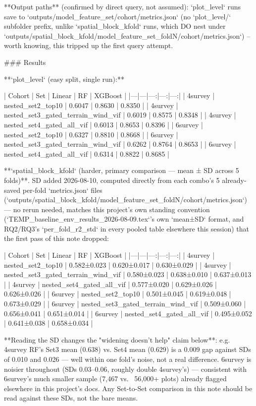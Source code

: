 **Output paths** (confirmed by direct query, not assumed): `plot_level` runs save to
`outputs/{model}_{feature_set}/{cohort}/metrics.json` (no `plot_level/` subfolder prefix, unlike
`spatial_block_kfold` runs, which DO nest under `outputs/spatial_block_kfold/{model}_{feature_set}_fold{N}/{cohort}/metrics.json`)
-- worth knowing, this tripped up the first query attempt.

### Results

**`plot_level` (easy split, single run):**

| Cohort | Set | Linear | RF | XGBoost |
|---|---|---:|---:|---:|
| 4survey | nested_set2_top10 | 0.6047 | 0.8630 | 0.8350 |
| 4survey | nested_set3_gated_terrain_wind_vif | 0.6019 | 0.8575 | 0.8348 |
| 4survey | nested_set4_gated_all_vif | 0.6013 | 0.8653 | 0.8396 |
| 6survey | nested_set2_top10 | 0.6327 | 0.8810 | 0.8668 |
| 6survey | nested_set3_gated_terrain_wind_vif | 0.6262 | 0.8764 | 0.8653 |
| 6survey | nested_set4_gated_all_vif | 0.6314 | 0.8822 | 0.8685 |

**`spatial_block_kfold` (harder, primary comparison — mean ± SD across 5 folds)**. SD added
2026-08-10, computed directly from each combo's 5 already-saved per-fold `metrics.json` files
(`outputs/spatial_block_kfold/{model}_{feature_set}_fold{N}/{cohort}/metrics.json`) — no rerun
needed, matches this project's own standing convention (`TEMP_baseline_env_results_2026-08-09.tex`'s
own `mean±SD` format, and RQ2/RQ3's `per_fold_r2_std` in every pooled table elsewhere this
session) that the first pass of this note dropped:

| Cohort | Set | Linear | RF | XGBoost |
|---|---|---:|---:|---:|
| 4survey | nested_set2_top10 | 0.582±0.023 | 0.620±0.017 | 0.630±0.029 |
| 4survey | nested_set3_gated_terrain_wind_vif | 0.580±0.023 | 0.638±0.010 | 0.637±0.013 |
| 4survey | nested_set4_gated_all_vif | 0.577±0.020 | 0.629±0.026 | 0.626±0.026 |
| 6survey | nested_set2_top10 | 0.501±0.045 | 0.619±0.048 | 0.673±0.029 |
| 6survey | nested_set3_gated_terrain_wind_vif | 0.509±0.060 | 0.656±0.041 | 0.651±0.014 |
| 6survey | nested_set4_gated_all_vif | 0.495±0.052 | 0.641±0.038 | 0.658±0.034 |

**Reading the SD changes the "widening doesn't help" claim below**: e.g. 4survey RF's Set3 mean
(0.638) vs. Set4 mean (0.629) is a 0.009 gap against SDs of 0.010 and 0.026 — well within one
fold's noise, not a real difference. 6survey is noisier throughout (SDs 0.03–0.06, roughly double
4survey's) — consistent with 6survey's much smaller sample (7,467 vs. ~56,000+ plots) already
flagged elsewhere in this project's docs. Any Set-to-Set comparison in this note should be read
against these SDs, not the bare means.

